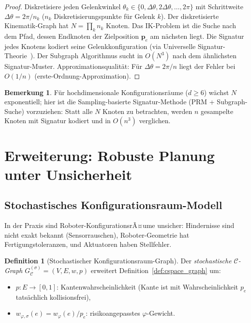 ﻿\documentclass[a4paper,12pt]{article}
\theoremstyle{definition}
\newtheorem{definition}{Definition}
\newtheorem{bemerkung}{Bemerkung}
\newcommand{\Cspace}{\mathcal{C}}
\begin{document}
\begin{proof}
Diskretisiere jeden Gelenkwinkel $\theta_k \in \{0, \Delta\theta, 2\Delta\theta, \ldots, 2\pi\}$
mit Schrittweite $\Delta\theta = 2\pi/n_k$ ($n_k$ Diskretisierungspunkte f\"ur Gelenk $k$).
Der diskretisierte Kinematik-Graph hat $N = \prod_k n_k$ Knoten.
Das IK-Problem ist die Suche nach dem Pfad, dessen Endknoten
der Zielposition $\mathbf{p}_e$ am n\"achsten liegt.
Die Signatur jedes Knotens kodiert seine Gelenkkonfiguration
(via Universelle Signatur-Theorie~\cite{epp2026ust}).
Der Subgraph Algorithmus sucht in $O(N^3)$ nach dem
\"ahnlichsten Signatur-Muster.
Approximationsqualit\"at: F\"ur $\Delta\theta = 2\pi/n$
liegt der Fehler bei $O(1/n)$ (erste-Ordnung-Approximation).
\end{proof}

\begin{bemerkung}
F\"ur hochdimensionale Konfigurationsr\"aume ($d \geq 6$) w\"achst $N$ exponentiell;
hier ist die Sampling-basierte Signatur-Methode (PRM + Subgraph-Suche)
vorzuziehen: Statt alle $N$ Knoten zu betrachten, werden $n$ gesampelte
Knoten mit Signatur kodiert und in $O(n^3)$ verglichen.
\end{bemerkung}

\section{Erweiterung: Robuste Planung unter Unsicherheit}

\subsection{Stochastisches Konfigurationsraum-Modell}

In der Praxis sind Roboter-KonfigurationsrÃ¤ume unsicher:
Hindernisse sind nicht exakt bekannt (Sensorrauschen), Roboter-Geometrie
hat Fertigungstoleranzen, und Aktuatoren haben Stellfehler.

\begin{definition}[Stochastischer Konfigurationsraum-Graph]
Der \emph{stochastische $\Cspace$-Graph} $G_{\Cspace}^{(\sigma)} = (V, E, w, p)$
erweitert Definition~\ref{def:cspace_graph} um:
\begin{itemize}
    \item $p: E \to [0,1]$: Kantenwahrscheinlichkeit (Kante ist mit Wahrscheinlichkeit
          $p_e$ tats\"achlich kollisionsfrei),
    \item $w_{\varphi,\sigma}(e) = w_\varphi(e) / p_e$: risikoangepasstes
          $\varphi$-Gewicht.
\end{itemize}
\end{definition}
\end{document}
